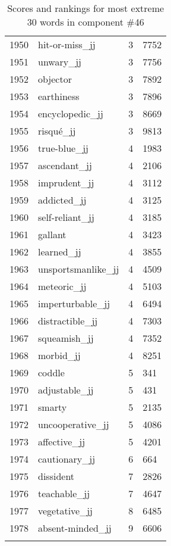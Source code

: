 \begin{longtable}[!htbp]{| rlr@{.}l |}
    1950 & hit-or-miss\_jj & 3 & 7752 \\
    1951 & unwary\_jj & 3 & 7756 \\
    1952 & objector & 3 & 7892 \\
    1953 & earthiness & 3 & 7896 \\
    1954 & encyclopedic\_jj & 3 & 8669 \\
    1955 & risqué\_jj & 3 & 9813 \\
    1956 & true-blue\_jj & 4 & 1983 \\
    1957 & ascendant\_jj & 4 & 2106 \\
    1958 & imprudent\_jj & 4 & 3112 \\
    1959 & addicted\_jj & 4 & 3125 \\
    1960 & self-reliant\_jj & 4 & 3185 \\
    1961 & gallant & 4 & 3423 \\
    1962 & learned\_jj & 4 & 3855 \\
    1963 & unsportsmanlike\_jj & 4 & 4509 \\
    1964 & meteoric\_jj & 4 & 5103 \\
    1965 & imperturbable\_jj & 4 & 6494 \\
    1966 & distractible\_jj & 4 & 7303 \\
    1967 & squeamish\_jj & 4 & 7352 \\
    1968 & morbid\_jj & 4 & 8251 \\
    1969 & coddle & 5 & 341 \\
    1970 & adjustable\_jj & 5 & 431 \\
    1971 & smarty & 5 & 2135 \\
    1972 & uncooperative\_jj & 5 & 4086 \\
    1973 & affective\_jj & 5 & 4201 \\
    1974 & cautionary\_jj & 6 & 664 \\
    1975 & dissident & 7 & 2826 \\
    1976 & teachable\_jj & 7 & 4647 \\
    1977 & vegetative\_jj & 8 & 6485 \\
    1978 & absent-minded\_jj & 9 & 6606 \\
    \hline
    \caption{Scores and rankings for most extreme 30 words in component \#46} \\
\end{longtable}
